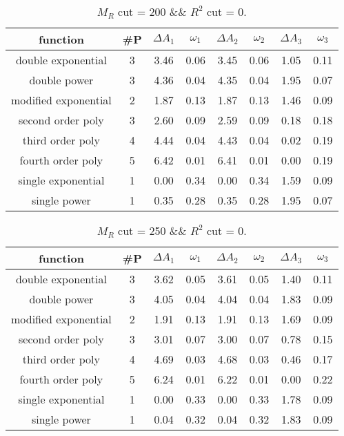  
\begin{table}[H] 
\begin{center} 
\begin{tabular}{|c|c|cc|cc|cc|} 
\hline function & \#P & $\Delta A_1$ & $\omega_1$ & $\Delta A_2$ & $\omega_2$ & $\Delta A_3$ & $\omega_3$ \\ \hline 
double exponential &  3 &   3.46 &   0.06 &   3.45 &   0.06 &   1.05 &   0.11 \\ 
double power &  3 &   4.36 &   0.04 &   4.35 &   0.04 &   1.95 &   0.07 \\ 
modified exponential &  2 &   1.87 &   0.13 &   1.87 &   0.13 &   1.46 &   0.09 \\ 
second order poly &  3 &   2.60 &   0.09 &   2.59 &   0.09 &   0.18 &   0.18 \\ 
third order poly &  4 &   4.44 &   0.04 &   4.43 &   0.04 &   0.02 &   0.19 \\ 
fourth order poly &  5 &   6.42 &   0.01 &   6.41 &   0.01 &   0.00 &   0.19 \\ 
single exponential &  1 &   0.00 &   0.34 &   0.00 &   0.34 &   1.59 &   0.09 \\ 
single power &  1 &   0.35 &   0.28 &   0.35 &   0.28 &   1.95 &   0.07 \\ 
\hline 
\end{tabular} 
\caption{$M_R$ cut = 200 \&\& $R^2$ cut = 0.} 
\label{tab:FitChoices_200_0} 
\end{center} 
\end{table} 
 
 
\begin{table}[H] 
\begin{center} 
\begin{tabular}{|c|c|cc|cc|cc|} 
\hline function & \#P & $\Delta A_1$ & $\omega_1$ & $\Delta A_2$ & $\omega_2$ & $\Delta A_3$ & $\omega_3$ \\ \hline 
double exponential &  3 &   3.62 &   0.05 &   3.61 &   0.05 &   1.40 &   0.11 \\ 
double power &  3 &   4.05 &   0.04 &   4.04 &   0.04 &   1.83 &   0.09 \\ 
modified exponential &  2 &   1.91 &   0.13 &   1.91 &   0.13 &   1.69 &   0.09 \\ 
second order poly &  3 &   3.01 &   0.07 &   3.00 &   0.07 &   0.78 &   0.15 \\ 
third order poly &  4 &   4.69 &   0.03 &   4.68 &   0.03 &   0.46 &   0.17 \\ 
fourth order poly &  5 &   6.24 &   0.01 &   6.22 &   0.01 &   0.00 &   0.22 \\ 
single exponential &  1 &   0.00 &   0.33 &   0.00 &   0.33 &   1.78 &   0.09 \\ 
single power &  1 &   0.04 &   0.32 &   0.04 &   0.32 &   1.83 &   0.09 \\ 
\hline 
\end{tabular} 
\caption{$M_R$ cut = 250 \&\& $R^2$ cut = 0.} 
\label{tab:FitChoices_250_0} 
\end{center} 
\end{table} 
 
